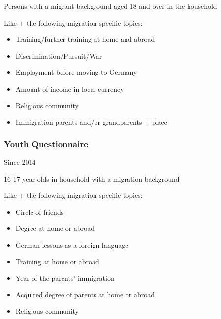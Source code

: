 \documentclass[letterpaper,10pt,openany,onesideH,english]{sphinxmanual}
\begin{document}
 Persons with a migrant background aged 18 and over in the household


Like {\hyperref[\detokenize{Contents of SOEPcore/index:individual-questionnaire}]{}} + the following migration-specific topics:
\begin{itemize}
\item {} 
Training/further training at home and abroad

\item {} 
Discrimination/Pursuit/War

\item {} 
Employment before moving to Germany

\item {} 
Amount of income in local currency

\item {} 
Religious community

\item {} 
Immigration parents and/or grandparents + place

\end{itemize}


\subsubsection{Youth Questionnaire}
\label{\detokenize{Contents of SOEPcore/index:id29}}
 Since 2014

 16-17 year olds in household with a migration background


Like {\hyperref[\detokenize{Contents of SOEPcore/index:biography-questionnaire}]{}}  + the following migration-specific topics:
\begin{itemize}
\item {} 
Circle of friends

\item {} 
Degree at home or abroad

\item {} 
German lessons as a foreign language

\item {} 
Training at home or abroad

\item {} 
Year of the parents’ immigration

\item {} 
Acquired degree of parents at home or abroad

\item {} 
Religious community

\end{itemize}
\end{document}
